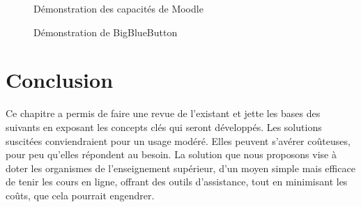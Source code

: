 \newpage
\begin{figure}[h]
  \centering
  \caption{Démonstration des capacités de Moodle}
  \label{fig:moodle_demo}
\end{figure}

\begin{figure}[h]
  \centering
  \caption{Démonstration de BigBlueButton}
  \label{fig:bbg_demo}
\end{figure}

\section*{Conclusion}
Ce chapitre a permis de faire une revue de l’existant et jette les bases des 
suivants en exposant les concepts clés qui seront développés. 
Les solutions suscitées conviendraient pour un usage modéré. 
Elles peuvent s'avérer coûteuses, pour peu qu’elles répondent au besoin. 
La solution que nous proposons vise à doter les organismes de l’enseignement supérieur, 
d’un moyen simple mais efficace de tenir les cours en ligne, offrant des outils d’assistance, 
tout en minimisant les coûts, que cela pourrait engendrer.
